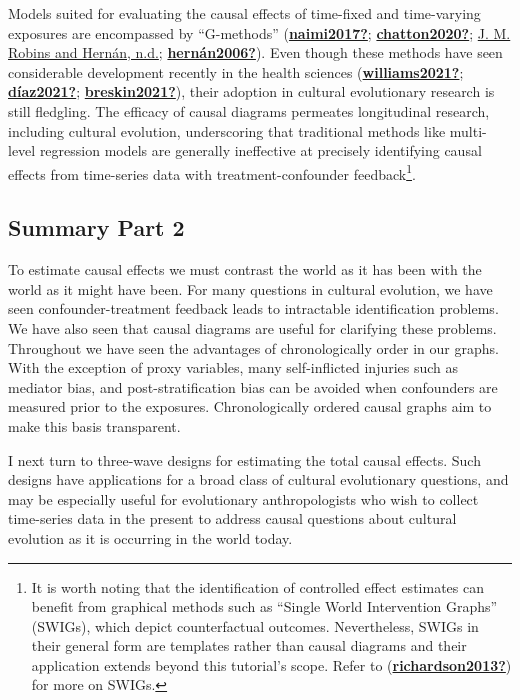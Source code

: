 \documentclass[
  singlecolumn]{report}
\begin{document}
Models suited for evaluating the causal effects of time-fixed and
time-varying exposures are encompassed by ``G-methods''
(\protect\hyperlink{ref-naimi2017}{\textbf{naimi2017?}};
\protect\hyperlink{ref-chatton2020}{\textbf{chatton2020?}};
\protect\hyperlink{ref-robins}{J. M. Robins and Hernán, n.d.};
\protect\hyperlink{ref-hernuxe1n2006}{\textbf{hernán2006?}}). Even
though these methods have seen considerable development recently in the
health sciences
(\protect\hyperlink{ref-williams2021}{\textbf{williams2021?}};
\protect\hyperlink{ref-duxedaz2021}{\textbf{díaz2021?}};
\protect\hyperlink{ref-breskin2021}{\textbf{breskin2021?}}), their
adoption in cultural evolutionary research is still fledgling. The
efficacy of causal diagrams permeates longitudinal research, including
cultural evolution, underscoring that traditional methods like
multi-level regression models are generally ineffective at precisely
identifying causal effects from time-series data with
treatment-confounder feedback\footnote{It is worth noting that the
  identification of controlled effect estimates can benefit from
  graphical methods such as ``Single World Intervention Graphs''
  (SWIGs), which depict counterfactual outcomes. Nevertheless, SWIGs in
  their general form are templates rather than causal diagrams and their
  application extends beyond this tutorial's scope. Refer to
  (\protect\hyperlink{ref-richardson2013}{\textbf{richardson2013?}}) for
  more on SWIGs.}.

\hypertarget{summary-part-2}{%
\subsection{Summary Part 2}\label{summary-part-2}}

To estimate causal effects we must contrast the world as it has been
with the world as it might have been. For many questions in cultural
evolution, we have seen confounder-treatment feedback leads to
intractable identification problems. We have also seen that causal
diagrams are useful for clarifying these problems. Throughout we have
seen the advantages of chronologically order in our graphs. With the
exception of proxy variables, many self-inflicted injuries such as
mediator bias, and post-stratification bias can be avoided when
confounders are measured prior to the exposures. Chronologically ordered
causal graphs aim to make this basis transparent.

I next turn to three-wave designs for estimating the total causal
effects. Such designs have applications for a broad class of cultural
evolutionary questions, and may be especially useful for evolutionary
anthropologists who wish to collect time-series data in the present to
address causal questions about cultural evolution as it is occurring in
the world today.
\end{document}
